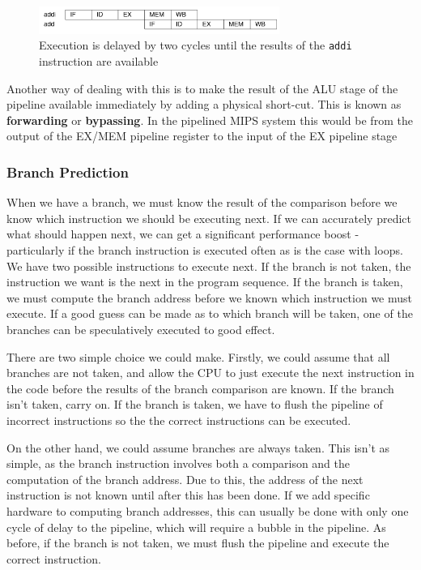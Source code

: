 \documentclass{article}
\begin{document}
	\begin{figure}
		\centering
		\includegraphics[width=0.7\textwidth]{pipelining_bubble}
		\caption{Execution is delayed by two cycles until the results of the \texttt{addi} instruction are available}
		\label{fig:pipelining bubble}
	\end{figure}
		
	Another way of dealing with this is to make the result of the ALU stage of the pipeline available immediately by adding a physical short-cut. This is known as \textbf{forwarding} or \textbf{bypassing}. In the pipelined MIPS system this would be from the output of the EX/MEM pipeline register to the input of the EX pipeline stage
	
	\subsubsection{Branch Prediction}
	When we have a branch, we must know the result of the comparison before we know which instruction we should be executing next. If we can accurately predict what should happen next, we can get a significant performance boost - particularly if the branch instruction is executed often as is the case with loops. We have two possible instructions to execute next. If the branch is not taken, the instruction we want is the next in the program sequence. If the branch is taken, we must compute the branch address before we known which instruction we must execute. If a good guess can be made as to which branch will be taken, one of the branches can be speculatively executed to good effect.
	
	There are two simple choice we could make. Firstly, we could assume that all branches are not taken, and allow the CPU to just execute the next instruction in the code before the results of the branch comparison are known. If the branch isn't taken, carry on. If the branch is taken, we have to flush the pipeline of incorrect instructions so the the correct instructions can be executed.
	
	\par On the other hand, we could assume branches are always taken. This isn't as simple, as the branch instruction involves both a comparison and the computation of the branch address. Due to this, the address of the next instruction is not known until after this has been done. If we add specific hardware to computing branch addresses, this can usually be done with only one cycle of delay to the pipeline, which will require a bubble in the pipeline. As before, if the branch is not taken, we must flush the pipeline and execute the correct instruction.
	
\end{document}
